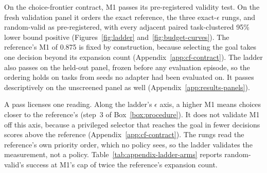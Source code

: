 On the choice-frontier contract, M1 passes its pre-registered validity test. On the fresh validation panel it orders the exact reference, the three exact-$\epsilon$ rungs, and random-valid as pre-registered, with every adjacent paired task-clustered 95\% lower bound positive (Figures~\ref{fig:ladder} and~\ref{fig:budget-curves}). The reference's M1 of 0.875 is fixed by construction, because selecting the goal takes one decision beyond its expansion count (Appendix~\ref{app:cf-contract}). The ladder also passes on the held-out panel, frozen before any evaluation episode, so the ordering holds on tasks from seeds no adapter had been evaluated on. It passes descriptively on the unscreened panel as well (Appendix~\ref{app:results-panels}).

A pass licenses one reading. Along the ladder's $\epsilon$ axis, a higher M1 means choices closer to the reference's (step~3 of Box~\ref{box:procedure}). It does not validate M1 off this axis, because a privileged selector that reaches the goal in fewer decisions scores above the reference (Appendix~\ref{app:cf-contract}). The rungs read the reference's own priority order, which no policy sees, so the ladder validates the measurement, not a policy. Table~\ref{tab:appendix-ladder-arms} reports random-valid's success at M1's cap of twice the reference's expansion count.

